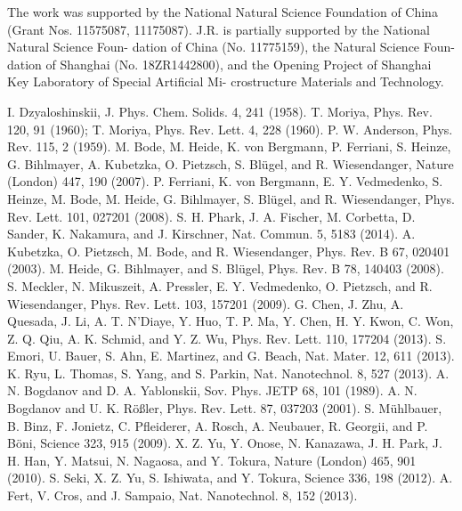 \documentclass[aps,prb,twocolumn,showpacs,amssymb]{revtex4-1}
\begin{document}
\acknowledgments
{The work was supported by the National Natural Science Foundation of China (Grant Nos. 11575087, 11175087). J.R. is partially supported by the National Natural Science Foun- dation of China (No. 11775159), the Natural Science Foun- dation of Shanghai (No. 18ZR1442800), and the Opening Project of Shanghai Key Laboratory of Special Artificial Mi- crostructure Materials and Technology.}


\begin{thebibliography}{99}
 I. Dzyaloshinskii, J. Phys. Chem. Solids. 4, 241 (1958).
 T. Moriya, Phys. Rev. 120, 91 (1960); T. Moriya, Phys. Rev. Lett. 4, 228 (1960).
 P. W. Anderson, Phys. Rev. 115, 2 (1959).
 M. Bode, M. Heide, K. von Bergmann, P. Ferriani, S. Heinze, G. Bihlmayer, A. Kubetzka, O. Pietzsch, S. Bl\"{u}gel, and R. Wiesendanger, Nature (London) 447, 190 (2007).
 P. Ferriani, K. von Bergmann, E. Y. Vedmedenko, S. Heinze, M. Bode, M. Heide, G. Bihlmayer, S. Bl\"{u}gel, and R. Wiesendanger, Phys. Rev. Lett. 101, 027201 (2008).
 S. H. Phark, J. A. Fischer, M. Corbetta, D. Sander, K. Nakamura, and J. Kirschner, Nat. Commun. 5, 5183 (2014).
 A. Kubetzka, O. Pietzsch, M. Bode, and R. Wiesendanger, Phys. Rev. B 67, 020401 (2003).
 M. Heide, G. Bihlmayer, and S. Bl\"{u}gel, Phys. Rev. B 78, 140403 (2008).
 S. Meckler, N. Mikuszeit, A. Pressler, E. Y. Vedmedenko, O. Pietzsch, and R. Wiesendanger, Phys. Rev. Lett. 103, 157201 (2009).
 G. Chen, J. Zhu, A. Quesada, J. Li, A. T. N'Diaye, Y. Huo, T. P. Ma, Y. Chen, H. Y. Kwon, C. Won, Z. Q. Qiu, A. K. Schmid, and Y. Z. Wu, Phys. Rev. Lett. 110, 177204 (2013).
 S. Emori, U. Bauer, S. Ahn, E. Martinez, and G. Beach, Nat. Mater. 12, 611 (2013).
 K. Ryu, L. Thomas, S. Yang, and S. Parkin, Nat. Nanotechnol. 8, 527 (2013).
 A. N. Bogdanov and D. A. Yablonskii, Sov. Phys. JETP 68, 101 (1989).
 A. N. Bogdanov and U. K. R\"{o}{\ss}ler, Phys. Rev. Lett. 87, 037203 (2001).
 S. M\"{u}hlbauer, B. Binz, F. Jonietz, C. Pfleiderer, A. Rosch, A. Neubauer, R. Georgii, and P. B\"{o}ni, Science 323, 915 (2009).
 X. Z. Yu, Y. Onose, N. Kanazawa, J. H. Park, J. H. Han, Y. Matsui, N. Nagaosa, and Y. Tokura, Nature (London) 465, 901 (2010).
 S. Seki, X. Z. Yu, S. Ishiwata, and Y. Tokura, Science 336, 198 (2012).
 A. Fert, V. Cros, and J. Sampaio, Nat. Nanotechnol. 8, 152 (2013).

\end{thebibliography}
\end{document}
